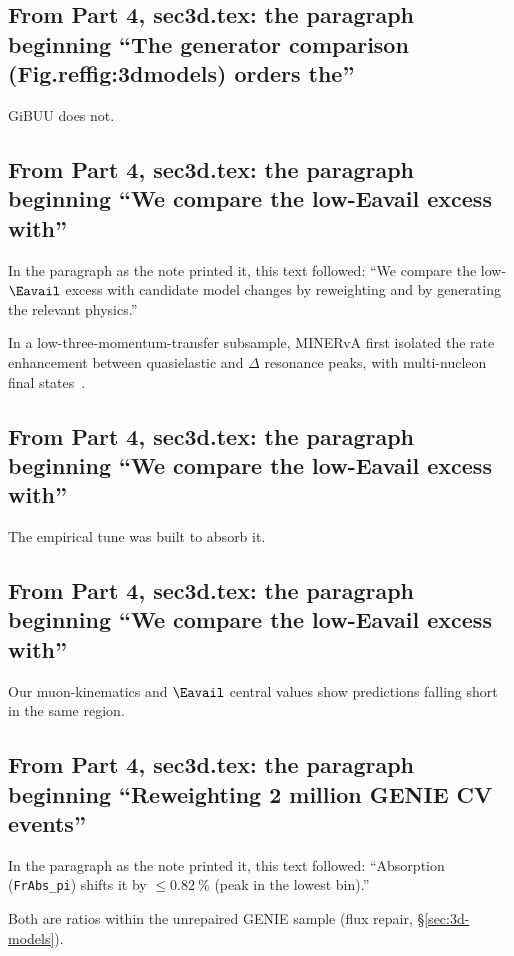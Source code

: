 \subsection{From Part 4, sec3d.tex: the paragraph beginning ``The generator comparison (Fig.reffig:3dmodels) orders the''}
GiBUU does not.

\subsection{From Part 4, sec3d.tex: the paragraph beginning ``We compare the low-Eavail excess with''}
In the paragraph as the note printed it, this text followed: ``We compare the low-$\Eavail$ excess with candidate model changes by reweighting and by generating the relevant physics.''\par
In a low-three-momentum-transfer subsample, MINERvA first isolated the rate enhancement between quasielastic and $\Delta$ resonance peaks, with multi-nucleon final states~\cite{MINERvA:2016lowrecoil}.

\subsection{From Part 4, sec3d.tex: the paragraph beginning ``We compare the low-Eavail excess with''}
The empirical tune was built to absorb it.

\subsection{From Part 4, sec3d.tex: the paragraph beginning ``We compare the low-Eavail excess with''}
Our muon-kinematics and $\Eavail$ central values show predictions falling short in the same region.

\subsection{From Part 4, sec3d.tex: the paragraph beginning ``Reweighting 2 million GENIE CV events''}
In the paragraph as the note printed it, this text followed: ``Absorption (\texttt{FrAbs\_pi}) shifts it by $\le\SI{0.82}{\percent}$ (peak in the lowest bin).''\par
Both are ratios within the unrepaired GENIE sample (flux repair, \S\ref{sec:3d-models}).

